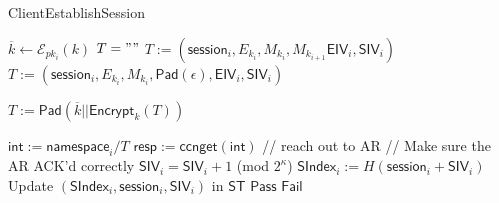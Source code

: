 \documentclass[10pt]{article}
\begin{document}



\begin{algorithm}[ht!]
\caption{{\sf ClientEstablishSession}}
  \begin{algorithmic}[1]
  \State $\overline{k} \gets \mathcal{E}_{pk_i}(k)$
  \State $T = ""$
    \State $T := (\mathsf{session}_i, E_{k_i}, M_{k_i}, M_{k_{i+1}} \mathsf{EIV}_i, \mathsf{SIV}_i)$
  \Else
    \State $T := (\mathsf{session}_i, E_{k_i}, M_{k_i}, \mathsf{Pad}(\epsilon), \mathsf{EIV}_i, \mathsf{SIV}_i)$
  \EndIf

  \State $T := \mathsf{Pad}(\overline{k} || \mathsf{Encrypt}_k(T))$

  \State $\mathsf{int} := \mathsf{namespace}_i/T$
  \State $\mathsf{resp} := \mathsf{ccnget}(\mathsf{int})$ // reach out to AR
   // Make sure the AR ACK'd correctly
    \State $\mathsf{SIV}_i = \mathsf{SIV}_i + 1$ (mod $2^{\kappa}$)
    \State $\mathsf{SIndex}_i := H(\mathsf{session}_i + \mathsf{SIV}_i)$
    \State Update $(\mathsf{SIndex}_i, \mathsf{session}_i, \mathsf{SIV}_i)$ in $\mathsf{ST}$
    \State \Return $\mathsf{Pass}$
  \Else
    \State \Return $\mathsf{Fail}$
  \EndIf

  \end{algorithmic}
\end{algorithm}
\end{document}
